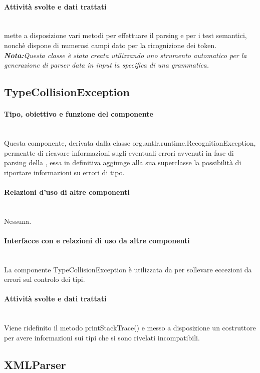 \documentclass[11pt,titlepage,a4paper]{report}
\begin{document}
\paragraph{Attivit\`a svolte e dati trattati}\\
\brp mette a disposizione vari metodi per effettuare il parsing e per i test semantici, nonch\`e dispone di numerosi campi dato per la ricognizione dei token.
\textit{\textbf{Nota:}Questa classe \`e stata creata utilizzando uno strumento automatico per la generazione di parser data in input la specifica di una grammatica.}

\subsection{TypeCollisionException}
\paragraph{Tipo, obiettivo e funzione del componente}\\
Questa componente, derivata dalla classe org.antlr.runtime.RecognitionException, permentte di ricavare informazioni sugli eventuali errori avvenuti in fase di parsing della \br, essa in definitiva aggiunge alla sua superclasse la possibilit\`a di riportare informazioni su errori di tipo.
\paragraph{Relazioni d'uso di altre componenti}\\
Nessuna.
\paragraph{Interfacce con e relazioni di uso da altre componenti}\\
La componente TypeCollisionException \`e utilizzata da \brp per sollevare eccezioni da errori sul controlo dei tipi.
\paragraph{Attivit\`a svolte e dati trattati}\\
Viene ridefinito il metodo printStackTrace() e messo a disposizione un costruttore per avere informazioni sui tipi che si sono rivelati incompatibili.

\subsection{XMLParser}%
\end{document}
